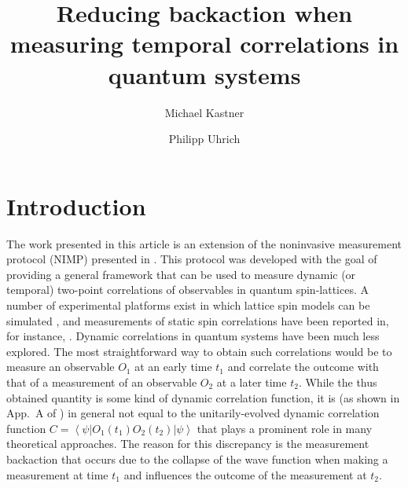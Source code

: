 \documentclass[epjST,numbook]{svjour}
\newcommand{\matel}[3]{ \displaystyle \left\langle #1 \right \vert #2 \left\vert  #3 \right\rangle }
\begin{document}
%
\title{Reducing backaction when measuring temporal correlations in quantum systems} 
\author{Michael Kastner\and Philipp Uhrich}
%
%
%
%
\maketitle
%
\section{Introduction}
\label{intro}

The work presented in this article is an extension of the noninvasive measurement protocol (NIMP) presented in \cite{Uhrich_etal}.
This protocol was developed with the goal of providing a general framework that can be used to measure dynamic (or temporal) two-point correlations of observables in quantum spin-lattices.
A number of experimental platforms exist in which lattice spin models can be simulated \cite{Yan_etal13,Schwarzkopf2011,Lahaye_etal09,Britton_etal12,Ozeri2011,Zeiher_etal2016,Bakr_etal2009}, and measurements of static spin correlations have been reported in, for instance, \cite{Zhang_etal2017,Zeiher_etal2016}. Dynamic correlations in quantum systems have been much less explored. The most straightforward way to obtain such correlations would be to measure an observable $O_1$ at an early time $t_1$ and correlate the outcome with that of a measurement of an observable $O_2$ at a later time $t_2$. While the thus obtained quantity is some kind of dynamic correlation function, it is (as shown in App.~A of \cite{Uhrich_etal}) in general not equal to the unitarily-evolved dynamic correlation function $C=\matel{\psi}{O_1(t_1)O_2(t_2)}{\psi}$ that plays a prominent role in many theoretical approaches. The reason for this discrepancy is the measurement backaction that occurs due to the collapse of the wave function when making a measurement at time $t_1$ and influences the outcome of the measurement at $t_2$.
\end{document}
